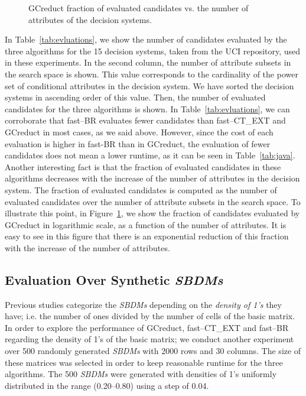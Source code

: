 \documentclass[number,preprint,review,12pt]{elsarticle}
\begin{document}
	\begin{figure}[htb]
		\begin{center}
		\end{center}
		\caption{GCreduct fraction of evaluated candidates vs. the number of attributes of the decision systems.}
		\label{fig:candidates}
	\end{figure}	

	In Table~\ref{tab:evluations}, we show the number of candidates evaluated by the three algorithms for the 15 decision systems, taken from the UCI repository, used in these experiments. In the second column, the number of attribute subsets in the search space is shown. This value corresponds to the cardinality of the power set of conditional attributes in the decision system. We have sorted the decision systems in ascending order of this value. Then, the number of evaluated candidates for the three algorithms is shown. In Table~\ref{tab:evluations}, we can corroborate that fast--BR evaluates fewer candidates than fast--CT\_EXT and GCreduct in most cases, as we said above. However, since the cost of each evaluation is higher in fast-BR than in GCreduct, the evaluation of fewer candidates does not mean a lower runtime, as it can be seen in Table~\ref{tab:java}. Another interesting fact is that the fraction of evaluated candidates in these algorithms decreases with the increase of the number of attributes in the decision system. The fraction of evaluated candidates is computed as the number of evaluated candidates over the number of attribute subsets in the search space. To illustrate this point, in Figure~\ref{fig:candidates}, we show the fraction of candidates evaluated by GCreduct in logarithmic scale, as a function of the number of attributes. It is easy to see in this figure that there is an exponential reduction of this fraction with the increase of the number of attributes. \label{par:brutal}
		
		
\subsection{Evaluation Over Synthetic \textit{SBDMs}}\label{sub:synth}

	Previous studies \citep{Rojas12,Lias13,Rodriguez15} categorize the \textit{SBDMs} depending on the \emph{density of 1's} they have; i.e. the number of ones divided by the number of cells of the basic matrix. In order to explore the performance of GCreduct, fast--CT\_EXT and fast--BR regarding the density of 1's of the basic matrix; we conduct another experiment over 500 randomly generated \textit{SBDMs} with 2000 rows and 30 columns. The size of these matrices was selected in order to keep reasonable runtime for the three algorithms. The 500 \textit{SBDMs} were generated with densities of 1's uniformly distributed in the range (0.20--0.80) using a step of 0.04. 
				
\end{document}
